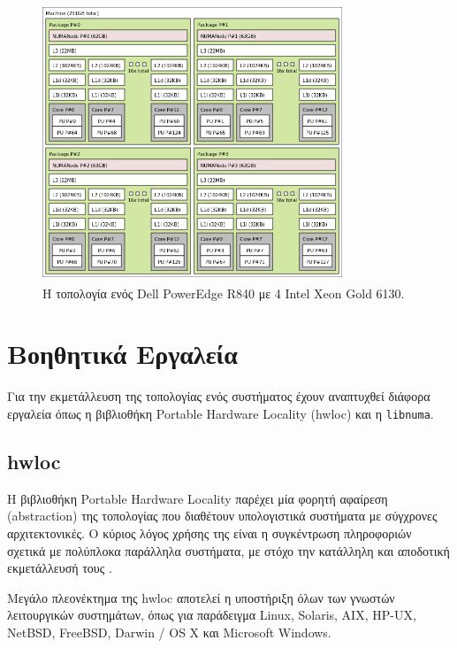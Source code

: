 \begin{figure}[t]
	\centering
	\includegraphics[width=0.8\textwidth]{Figures/parade-topo.png}
	\linebreak
	\caption{Η τοπολογία ενός Dell PowerEdge R840 με 4 Intel\textsuperscript{\textregistered} Xeon\textsuperscript{\textregistered} Gold 6130.}
	\label{fig:parade-topo}
\end{figure}


\section{Βοηθητικά Εργαλεία}
\label{sec:Utility Tools}
Για την εκμετάλλευση της τοπολογίας ενός συστήματος έχουν αναπτυχθεί διάφορα εργαλεία όπως η βιβλιοθήκη Portable Hardware Locality (hwloc) και η \texttt{libnuma}.

\subsection{hwloc}
\label{ssec:hwloc}
Η βιβλιοθήκη Portable Hardware Locality παρέχει μία φορητή αφαίρεση (abstraction) της τοπολογίας που διαθέτουν υπολογιστικά συστήματα με σύγχρονες αρχιτεκτονικές. Ο κύριος λόγος χρήσης της είναι η συγκέντρωση πληροφοριών σχετικά με πολύπλοκα παράλληλα συστήματα, με στόχο την κατάλληλη και αποδοτική εκμετάλλευσή τους \cite{broquedis2010hwloc}. 

Μεγάλο πλεονέκτημα της hwloc αποτελεί η υποστήριξη όλων των γνωστών λειτουργικών συστημάτων, όπως για παράδειγμα Linux, Solaris, AIX, HP-UX, NetBSD, FreeBSD, Darwin / OS X και Microsoft Windows.

